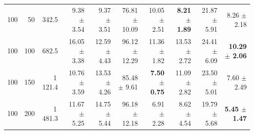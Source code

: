 \begin{tabular}{rrrrrrrrrr}
100 & 50 & 342.5 & 9.38 $\pm$ 3.54 & 9.37 $\pm$ 3.51 & 76.81 $\pm$ 10.09 & 10.05 $\pm$ 2.51 & \textbf{8.21 $\pm$ 1.89} & 21.87 $\pm$ 5.91 & 8.26 $\pm$ 2.18 \\
100 & 100 & 682.5 & 16.05 $\pm$ 3.38 & 12.59 $\pm$ 4.43 & 96.12 $\pm$ 12.29 & 11.36 $\pm$ 1.82 & 13.53 $\pm$ 2.72 & 24.41 $\pm$ 6.09 & \textbf{10.29 $\pm$ 2.06} \\
100 & 150 & 1\,121.4 & 10.76 $\pm$ 3.59 & 13.53 $\pm$ 4.26 & 85.48 $\pm$ 9.61 & \textbf{7.50 $\pm$ 0.75} & 11.09 $\pm$ 2.82 & 23.50 $\pm$ 5.01 & 7.60 $\pm$ 2.49 \\
100 & 200 & 1\,481.3 & 11.67 $\pm$ 5.25 & 14.75 $\pm$ 5.44 & 96.18 $\pm$ 12.18 & 6.91 $\pm$ 2.28 & 8.62 $\pm$ 4.54 & 19.79 $\pm$ 5.68 & \textbf{5.45 $\pm$ 1.47} \\
\bottomrule
\end{tabular}
